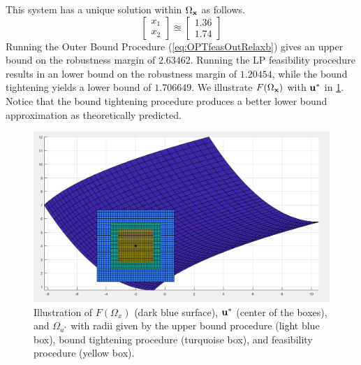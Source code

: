 %
This system has a unique solution within $\Omega_{\mathbf{x}}$ as follows.
\[\begin{bmatrix}
x_1 \\
x_2
\end{bmatrix}
\approxeq
\begin{bmatrix}
1.36 \\
1.74
\end{bmatrix}
\] 
Running the Outer Bound Procedure (\cref{eq:OPTfeasOutRelaxb}) gives an upper bound on the robustness margin of $2.63462$.
Running the LP feasibility procedure results in an lower bound on the robustness margin of $1.20454$, while the bound tightening yields a lower bound of $1.706649$. 
We illustrate $F(\Omega_{\mathbf{x}})$ with $\mathbf{u}^*$ in \cref{fig:FOmega}.
Notice that the bound tightening procedure produces a better lower bound approximation as theoretically predicted.

\begin{figure}[htp!]
  \begin{center}
    \includegraphics[scale=0.45]{Figures/newex} %
  \end{center}
  \caption{\label{fig:FOmega}
    Illustration of $F(\Omega_x)$ (dark blue surface), $\mathbf{u}^*$ (center of the boxes), and $\Omega_{u^*}$  with radii given by the upper bound procedure (light blue box), bound tightening procedure (turquoise box), and feasibility procedure (yellow box).
  }
\end{figure}


